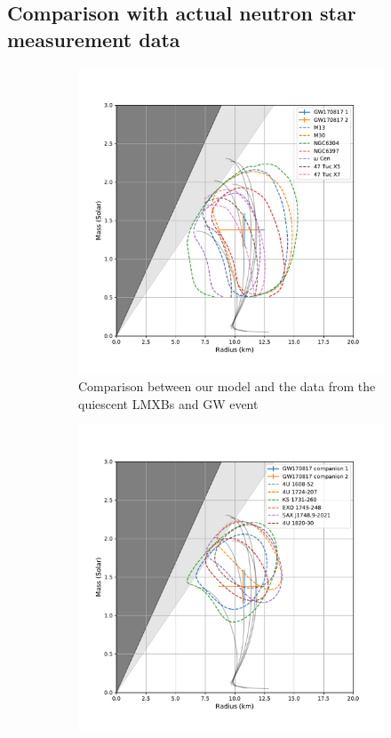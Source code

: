 \documentclass[draft,11pt]{article}
\theoremstyle{definition}
\theoremstyle{remark}
\begin{document}
        
        \subsection{Comparison with actual neutron star measurement data}
            \begin{figure}[h]\begin{center}
                \begin{subfigure}[b]{.49\textwidth}
                    \includegraphics[width=\textwidth]{eos_compare_obsv1_GW}
                    \caption{Comparison between our model and the data from the quiescent LMXBs and GW event}\label{fig/quiescent.LMXB}
                \end{subfigure}
                \begin{subfigure}[b]{.49\textwidth}
                    \includegraphics[width=\textwidth]{eos_compare_obsv2_GW}

\end{subfigure}
\end{center}
\end{figure}
\end{document}

